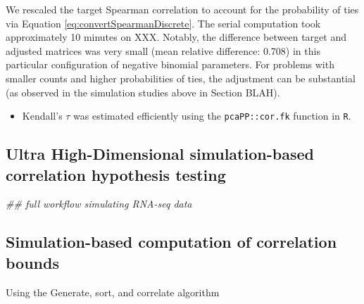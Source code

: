 \documentclass[
]{article}
\newenvironment{Shaded}{\begin{snugshade}}{\end{snugshade}}
\newcommand{\CommentTok}[1]{\textcolor[rgb]{0.56,0.35,0.01}{\textit{#1}}}
\providecommand{\tightlist}{%
  \setlength{\itemsep}{0pt}\setlength{\parskip}{0pt}}
\begin{document}
We rescaled the target Spearman correlation to account for the probability of ties via Equation \eqref{eq:convertSpearmanDiscrete}. The serial computation took approximately 10 minutes on XXX. Notably, the difference between target and adjusted matrices was very small (mean relative difference: 0.708) in this particular configuration of negative binomial parameters. For problems with smaller counts and higher probabilities of ties, the adjustment can be substantial (as observed in the simulation studies above in Section BLAH).

\begin{itemize}
\tightlist
\item
  Kendall's \(\tau\) was estimated efficiently using the \texttt{pcaPP::cor.fk} function in \texttt{R}.
\end{itemize}

\hypertarget{ultra-high-dimensional-simulation-based-correlation-hypothesis-testing}{%
\subsection{Ultra High-Dimensional simulation-based correlation hypothesis testing}\label{ultra-high-dimensional-simulation-based-correlation-hypothesis-testing}}

\begin{Shaded}
\begin{Highlighting}[]
\CommentTok{## full workflow simulating RNA-seq data}
\end{Highlighting}
\end{Shaded}

\hypertarget{simulation-based-computation-of-correlation-bounds}{%
\subsection{Simulation-based computation of correlation bounds}\label{simulation-based-computation-of-correlation-bounds}}

Using the Generate, sort, and correlate algorithm \citet{Demirtas2011}
\end{document}
